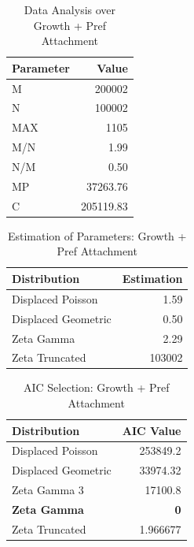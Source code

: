 \documentclass[12pt, a4paper]{article}
\begin{document}
\begin{table}[H]
    \centering
    \begin{tabular}{l r}
        Parameter & Value\\
        \hline              
        M & 200002\\
        N & 100002\\
        MAX & 1105\\
        M/N & 1.99\\
        N/M & 0.50\\
        MP & 37263.76\\
        C & 205119.83
    \end{tabular}
    \caption{Data Analysis over Growth + Pref Attachment}
    \label{table:grow_pref_att_1}
\end{table}

\begin{table}[H]
    \centering
    \begin{tabular}{l r}
        Distribution & Estimation\\
        \hline
        Displaced Poisson & 1.59\\
        Displaced Geometric & 0.50\\
        Zeta Gamma & 2.29\\ 
        Zeta Truncated & 103002\\
    \end{tabular}
    \caption{Estimation of Parameters: Growth + Pref Attachment}
    \label{table:grow_pref_att_2}
\end{table}

\begin{table}[H]
    \centering
    \begin{tabular}{l r}
        Distribution & AIC Value\\
        \hline
        Displaced Poisson & 253849.2\\
        Displaced Geometric & 33974.32\\
        Zeta Gamma 3 & 17100.8\\
        \textbf{Zeta Gamma} & \textbf{0}\\ 
        Zeta Truncated & 1.966677\\
    \end{tabular}
    \caption{AIC Selection: Growth + Pref Attachment}
    \label{table:grow_pref_att_3}
\end{table}
\end{document}
